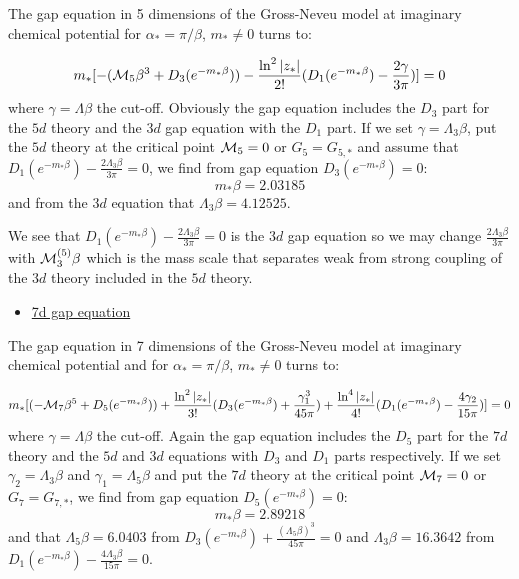 \documentclass[twoside]{article}
\begin{document}
 The gap equation in 5 dimensions of the Gross-Neveu model at imaginary chemical potential for $\alpha_*=\pi/\beta$, $m_*\not=0$ turns to:
 
\begin{equation}
m_*[-({\cal M}_5\beta^3+D_3(e^{-m_*\beta}))-\frac{\ln^2|z_*|}{2!}(D_1(e^{-m_*\beta})-\frac{2\gamma}{3\pi})]=0
\end{equation}
where $\gamma=\Lambda\beta$ the cut-off. Obviously the gap equation includes the $D_3$ part for the $5d$ theory and the $3d$ gap equation with the $D_1$ part. If we set $\gamma=\Lambda_3\beta$, put the $5d$ theory at the critical point ${\cal M}_5=0$ or $G_5=G_{5,*}$ and assume that $D_1(e^{-m_*\beta})-\frac{2\Lambda_3\beta}{3\pi}=0$, we find from gap equation $D_3(e^{-m_*\beta})=0$: 
\begin{equation}
\boxed
{m_*\beta=2.03185}
\end{equation}
and from the $3d$ equation that $\Lambda_3\beta=4.12525$. 
 
We see that $D_1(e^{-m_*\beta})-\frac{2\Lambda_3\beta}{3\pi}=0$ is the $3d$ gap equation so we may change $\frac{2\Lambda_3\beta}{3\pi}$ with ${\cal M}_3^{(5)}\beta$ which is the mass scale that separates weak from strong coupling of the $3d$ theory included in the $5d$ theory. 
 
 \begin{itemize}
 	\item \underline{7d gap equation}
 \end{itemize}
 
 The gap equation in 7 dimensions of the Gross-Neveu model at imaginary chemical potential and for $\alpha_*=\pi/\beta$, $m_*\not=0$ turns to:
 
\begin{equation}
m_*[(-{\cal M}_7\beta^5+D_5(e^{-m_*\beta}))+\frac{\ln^2|z_*|}{3!}(D_3(e^{-m_*\beta})+\frac{\gamma_1^3}{45\pi})+\frac{\ln^4|z_*|}{4!}(D_1(e^{-m_*\beta})-\frac{4\gamma_2}{15\pi})]=0
\end{equation}
where $\gamma=\Lambda\beta$ the cut-off. Again the gap equation includes the $D_5$ part for the $7d$ theory and the $5d$ and $3d$ equations with $D_3$ and $D_1$ parts respectively. If we set $\gamma_2=\Lambda_3\beta$ and $\gamma_1=\Lambda_5\beta$ and put the $7d$ theory at the critical point ${\cal M}_7=0$ or $G_7=G_{7,*}$, we find from gap equation $D_5(e^{-m_*\beta})=0$:
\begin{equation}
\boxed 
{m_*\beta=2.89218}
\end{equation}
and that $\Lambda_5\beta=6.0403$ from $D_3(e^{-m_*\beta})+\frac{(\Lambda_5\beta)^3}{45\pi}=0$ and $\Lambda_3\beta=16.3642$ from $D_1(e^{-m_*\beta})-\frac{4\Lambda_3\beta}{15\pi}=0$.
\end{document}
